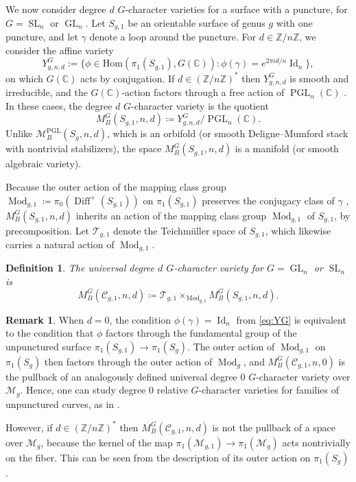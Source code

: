 \documentclass[11pt,reqno]{amsart}
\theoremstyle{plain} %
\newtheorem{definition}[theorem]{Definition}
\theoremstyle{definition}
\newtheorem{remark}[theorem]{Remark}
\newcommand{\CC}{\mathbb{C}}
\newcommand{\Hom}{\mathrm{Hom}}
\newcommand{\M}{\mathcal{M}}
\newcommand{\C}{\mathcal{C}}
\newcommand{\mc}{\mathcal}
\newcommand{\ZZ}{\mathbb{Z}}
\DeclareMathOperator{\Id}{Id}
\DeclareMathOperator{\Diff}{Diff}
\DeclareMathOperator{\GL}{GL}
\DeclareMathOperator{\SL}{SL}
\DeclareMathOperator{\PGL}{PGL}
\DeclareMathOperator{\Mod}{Mod}
\begin{document}
We now consider degree $d$ $G$-character varieties for a surface with a puncture, for $G = \SL_n$ or $\GL_n$.
Let $S_{g,1}$ be an orientable surface of genus $g$ with one puncture, and let $\gamma$ denote a loop around the puncture. For $d \in \ZZ/n\ZZ$, we consider the affine variety
\begin{equation} \label{eq:YG}
Y^G_{g,n,d} := \{\phi \in \Hom(\pi_1(S_{g,1}),G(\CC)) : \phi(\gamma) = e^{2\pi i d/n}\Id_n\},
\end{equation}
on which $G(\CC)$ acts by conjugation.  If $d \in (\ZZ/n\ZZ)^*$ then  $Y^G_{g,n,d}$ is smooth and irreducible, and the $G(\CC)$-action factors through a free action of $\PGL_n(\CC)$ \cite[Corollary~2.2.7]{Hausel-RV}. In these cases, the degree $d$ $G$-character variety is the quotient
\begin{equation}
	M_B^G(S_{g,1}, n,d) \coloneqq Y^G_{g,n,d}/\PGL_n(\CC).%
    \label{eq:degree-d-single-curve}
\end{equation}
Unlike $\M_{B}^{\PGL}(S_g,n,d)$, which is an orbifold (or smooth Deligne--Mumford stack with nontrivial stabilizers), the space $M_B^G(S_{g,1}, n,d)$ is a manifold (or smooth algebraic variety).


Because the outer action of the mapping class group $\Mod_{g,1} \coloneqq \pi_0(\Diff^+(S_{g,1}))$ on $\pi_1(S_{g,1})$ preserves the conjugacy class of $\gamma$ \cite[Theorem 8.8]{Farb-Margalit}, $M_{B}^G(S_{g,1},n,d)$ inherits an action of the mapping class group $\Mod_{g,1}$ of $S_{g,1}$, by precomposition. Let $\mc T_{g,1}$ denote the Teichm\"uller space of $S_{g,1}$, which likewise carries a natural action of $\Mod_{g,1}$.

\begin{definition}%
\label{defn: relative gl}
	The universal degree $d$ $G$-character variety for $G = \GL_n$ or $\SL_n$ is
\begin{equation}
		M_{B}^G(\C_{g,1}, n, d) \coloneqq \mc T_{g,1} \times_{\Mod_{g,1}} M_{B}^G(S_{g,1},n,d).
	\end{equation}
\end{definition}


\begin{remark} \label{remark: point-pushing}
	When $d = 0$, the condition  $\phi(\gamma) = \Id_n$ from \eqref{eq:YG} is equivalent to the condition that $\phi$ factors through the fundamental group of the unpunctured surface $\pi_1(S_{g,1}) \to \pi_1(S_g).$ The outer action of $\Mod_{g,1}$ on $\pi_1(S_g)$ then factors through the outer action of $\Mod_g$, and $M_B^G(\C_{g,1},n,0)$
    is the pullback of an analogously defined universal degree 0 $G$-character variety over $\M_g$. Hence, one can study degree 0 relative $G$-character varieties for families of unpunctured curves, as in   \cite[\S 6 and \S9]{Simpson-reps2}.

However, if $d \in (\ZZ/n\ZZ)^*$ then $M_{B}^{G}(\C_{g,1},n,d)$ is not the pullback of a space over $\M_g$, because the kernel of the map $\pi_1(\M_{g,1}) \to \pi_1(\M_g)$ acts nontrivially on the fiber. This can be seen from the description of its outer action on $\pi_1(S_g)$  \cite[Fact 4.7]{Farb-Margalit}. 
\end{remark}
\end{document}
